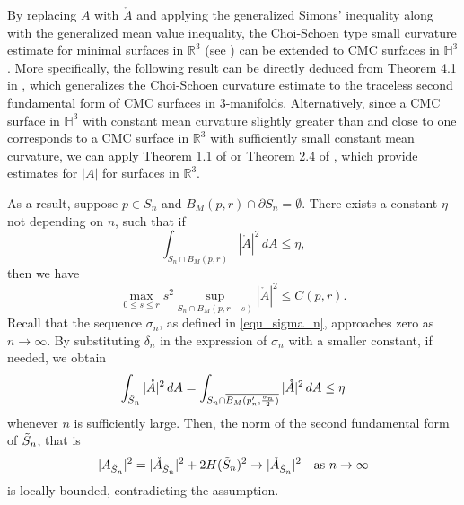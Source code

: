 \documentclass[12pt,a4paper]{amsart}
\numberwithin{equation}{section}
\theoremstyle{plain}
\theoremstyle{named}
\theoremstyle{definition}
\begin{document}
\begin{itemize}
        
        By replacing $A$ with $\mathring{A}$ and applying the generalized Simons' inequality along with the generalized mean value inequality, the Choi-Schoen type small curvature estimate for minimal surfaces in $\mathbb{R}^3$ (see \cite{Choi-Schoen}) can be extended to CMC surfaces in $\mathbb{H}^3$. More specifically, the following result can be directly deduced from Theorem 4.1 in \cite{Zhang}, which generalizes the Choi-Schoen curvature estimate to the traceless second fundamental form of CMC surfaces in 3-manifolds. Alternatively, since a CMC surface in $\mathbb{H}^3$ with constant mean curvature slightly greater than and close to one corresponds to a CMC surface in $\mathbb{R}^3$ with sufficiently small constant mean curvature, we can apply Theorem 1.1 of \cite{Bourna-Tinaglia} or Theorem 2.4 of \cite{Sun}, which provide estimates for $|A|$ for surfaces in $\mathbb{R}^3$.
        
        As a result, suppose $p\in S_n$ and $B_M(p,r)\cap \partial S_n=\emptyset$. There exists a constant $\eta$ not depending on $n$, such that if \begin{equation*}
            \int_{S_n\cap B_M(p,r)}|\mathring{A}|^2\,dA\leq \eta,
        \end{equation*}
        then we have \begin{equation*}
            \max_{0\leq s\leq r}s^2\sup_{S_n\cap B_M(p,r-s)}|\mathring{A}|^2\leq C(p,r).
        \end{equation*}
        Recall that the sequence $\sigma_n$, as defined in \eqref{equ_sigma_n}, approaches zero as $n\rightarrow\infty$. By substituting $\delta_n$ in the expression of $\sigma_n$ with a smaller constant, if needed, we obtain
        \begin{equation}\label{equ_eta}
            \int_{\Tilde{S}_n}|\mathring{A}|^2\,dA=\int_{S_n\cap \overline{B_M(p_n',\frac{\sigma_n}{2})}}|\mathring{A}|^2\,dA \leq \eta
        \end{equation} 
        whenever $n$ is sufficiently large. 
        Then, the norm of the second fundamental form of $\Tilde{S}_n$, that is \begin{equation*}
            |A_{\Tilde{S}_n}|^2=|\mathring{A}_{\Tilde{S}_n}|^2+2H(\Tilde{S}_n)^2\rightarrow |\mathring{A}_{\Tilde{S}_n}|^2\quad \text{as }n\rightarrow \infty
        \end{equation*} is locally bounded, contradicting the assumption. 
        

\end{itemize}
\end{document}
